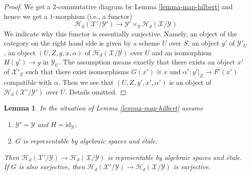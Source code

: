 \documentclass{stacks-project}
\theoremstyle{plain}
\newtheorem{lemma}[subsection]{Lemma}
\theoremstyle{definition}
\theoremstyle{remark}
\numberwithin{equation}{subsection}
\begin{document}
\begin{proof}
We get a $2$-commutative diagram by
Lemma \ref{lemma-map-hilbert}
and hence we get a $1$-morphism (i.e., a functor)
$$
\mathcal{H}_d(\mathcal{X}'/\mathcal{Y}')
\longrightarrow
\mathcal{Y}' \times_\mathcal{Y} \mathcal{H}_d(\mathcal{X}/\mathcal{Y})
$$
We indicate why this functor is essentially surjective. Namely, an object
of the category on the right hand side is given by a scheme $U$ over $S$,
an object $y'$ of $\mathcal{Y}'_U$, an object $(U, Z, y, x, \alpha)$
of $\mathcal{H}_d(\mathcal{X}/\mathcal{Y})$ over $U$ and an isomorphism
$H(y') \to y$ in $\mathcal{Y}_U$. The assumption means exactly that
there exists an object $x'$ of $\mathcal{X}'_Z$ such that there exist
isomorphisms $G(x') \cong x$ and $\alpha' : y'|_Z \to F'(x')$ compatible
with $\alpha$. Then we see that $(U, Z, y', x', \alpha')$ is an
object of $\mathcal{H}_d(\mathcal{X}'/\mathcal{Y}')$ over $U$.
Details omitted.
\end{proof}

\begin{lemma}
\label{lemma-etale-covering-hilbert}
In the situation of
Lemma \ref{lemma-map-hilbert}
assume
\begin{enumerate}
\item $\mathcal{Y}' = \mathcal{Y}$ and $H = \text{id}_\mathcal{Y}$,
\item $G$ is representable by algebraic spaces and \'etale.
\end{enumerate}
Then $\mathcal{H}_d(\mathcal{X}'/\mathcal{Y}) \to
\mathcal{H}_d(\mathcal{X}/\mathcal{Y})$ is representable by
algebraic spaces and \'etale.
If $G$ is also surjective, then
$\mathcal{H}_d(\mathcal{X}'/\mathcal{Y}) \to
\mathcal{H}_d(\mathcal{X}/\mathcal{Y})$ is surjective.
\end{lemma}
\end{document}
